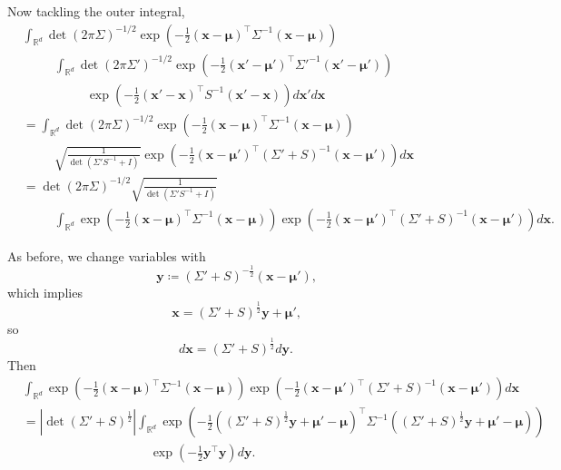 \documentclass[oneside, 11pt]{article}
\begin{document}
    Now tackling the outer integral, \begin{align*}
        &\int_{\mathbb{R}^d} \det(2\pi\Sigma)^{-1/2} \exp\left(-\frac12 \left(\mathbf{x}-\bm{\mu}\right)^\top \Sigma^{-1} \left(\mathbf{x}-\bm{\mu}\right) \right) \\
        &\hspace{30pt} \int_{\mathbb{R}^d} \det(2\pi\Sigma')^{-1/2} \exp\left(-\frac12 \left(\mathbf{x}'-\bm{\mu}'\right)^\top \Sigma'^{-1} \left(\mathbf{x'}-\bm{\mu}'\right) \right) \\
        &\hspace{60pt}\exp\left(-\frac12 \left(\mathbf{x}'-\mathbf{x}\right)^\top S^{-1} \left(\mathbf{x}'-\mathbf{x}\right) \right) d\mathbf{x}' d\mathbf{x} \\
        &= \int_{\mathbb{R}^d} \det(2\pi\Sigma)^{-1/2} \exp\left(-\frac12 \left(\mathbf{x}-\bm{\mu}\right)^\top \Sigma^{-1} \left(\mathbf{x}-\bm{\mu}\right) \right) \\
        &\hspace{30pt} \sqrt{\frac{1}{\det\left(\Sigma'S^{-1} + I\right)}} \exp\left(-\frac{1}{2}\left(\mathbf{x} - \bm{\mu}'\right)^\top \left(\Sigma' + S\right)^{-1}\left(\mathbf{x} - \bm{\mu}'\right)\right) d\mathbf{x} \\
        &= \det(2\pi\Sigma)^{-1/2} \sqrt{\frac{1}{\det\left(\Sigma'S^{-1} + I\right)}} \\
        &\hspace{30pt}\int_{\mathbb{R}^d} \exp\left(-\frac12 \left(\mathbf{x}-\bm{\mu}\right)^\top \Sigma^{-1} \left(\mathbf{x}-\bm{\mu}\right) \right) \exp\left(-\frac{1}{2}\left(\mathbf{x} - \bm{\mu}'\right)^\top \left(\Sigma' + S\right)^{-1}\left(\mathbf{x} - \bm{\mu}'\right)\right) d\mathbf{x} \text{.}
    \end{align*}

    As before, we change variables with \[
        \mathbf{y} \coloneqq \left(\Sigma' + S\right)^{-\frac12}\left(\mathbf{x} - \bm{\mu}'\right) \text{,}
    \] which implies \[
        \mathbf{x} = \left(\Sigma' + S\right)^{\frac12}\mathbf{y} + \bm{\mu}' \text{,}
    \] so \[
        d\mathbf{x} = \left(\Sigma' + S\right)^{\frac12}d\mathbf{y} \text{.}
    \] Then \begin{align*}
        &\int_{\mathbb{R}^d} \exp\left(-\frac12 \left(\mathbf{x}-\bm{\mu}\right)^\top \Sigma^{-1} \left(\mathbf{x}-\bm{\mu}\right) \right) \exp\left(-\frac{1}{2}\left(\mathbf{x} - \bm{\mu}'\right)^\top \left(\Sigma' + S\right)^{-1}\left(\mathbf{x} - \bm{\mu}'\right)\right) d\mathbf{x} \\
        &= \left|\det(\Sigma' + S)^{\frac12} \right|\int_{\mathbb{R}^d} \exp\left(-\frac12 \left(\left(\Sigma' + S\right)^{\frac12}\mathbf{y} + \bm{\mu}'-\bm{\mu}\right)^\top \Sigma^{-1} \left(\left(\Sigma' + S\right)^{\frac12}\mathbf{y} + \bm{\mu}'-\bm{\mu}\right) \right) \\
        &\hspace{120pt}\exp\left(-\frac{1}{2}\mathbf{y}^\top\mathbf{y}\right) d\mathbf{y} \text{.}
    \end{align*}
\end{document}
